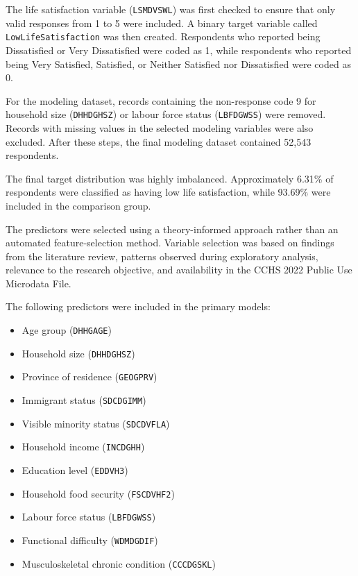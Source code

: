 \documentclass[12pt]{article}
\begin{document}
The life satisfaction variable (\texttt{LSMDVSWL}) was first checked to ensure that only valid responses from 1 to 5 were included. A binary target variable called \texttt{LowLifeSatisfaction} was then created. Respondents who reported being Dissatisfied or Very Dissatisfied were coded as 1, while respondents who reported being Very Satisfied, Satisfied, or Neither Satisfied nor Dissatisfied were coded as 0.

For the modeling dataset, records containing the non-response code 9 for household size (\texttt{DHHDGHSZ}) or labour force status (\texttt{LBFDGWSS}) were removed. Records with missing values in the selected modeling variables were also excluded. After these steps, the final modeling dataset contained 52,543 respondents.

The final target distribution was highly imbalanced. Approximately
6.31\% of respondents were classified as having low life satisfaction,
while 93.69\% were included in the comparison group.

The predictors were selected using a theory-informed approach rather than an automated feature-selection method. Variable selection was based on findings from the literature review, patterns observed during exploratory analysis, relevance to the research objective, and availability in the CCHS 2022 Public Use Microdata File.

The following predictors were included in the primary models:

\begin{itemize}
\item Age group (\texttt{DHHGAGE})
\item Household size (\texttt{DHHDGHSZ})
\item Province of residence (\texttt{GEOGPRV})
\item Immigrant status (\texttt{SDCDGIMM})
\item Visible minority status (\texttt{SDCDVFLA})
\item Household income (\texttt{INCDGHH})
\item Education level (\texttt{EDDVH3})
\item Household food security (\texttt{FSCDVHF2})
\item Labour force status (\texttt{LBFDGWSS})
\item Functional difficulty (\texttt{WDMDGDIF})
\item Musculoskeletal chronic condition (\texttt{CCCDGSKL})
\end{itemize}
\end{document}
